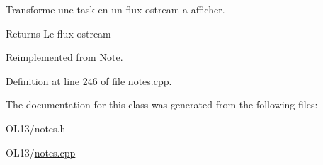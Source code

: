 Transforme une task en un flux ostream a afficher. 

\begin{DoxyReturn}{Returns}
Le flux ostream 
\end{DoxyReturn}


Reimplemented from \hyperlink{class_note_a1bd4acfbde0b71d05fd7d4ca889bca2b}{Note}.



Definition at line 246 of file notes.\+cpp.



The documentation for this class was generated from the following files\+:\begin{DoxyCompactItemize}
\item 
O\+L13/notes.\+h\item 
O\+L13/\hyperlink{notes_8cpp}{notes.\+cpp}\end{DoxyCompactItemize}
